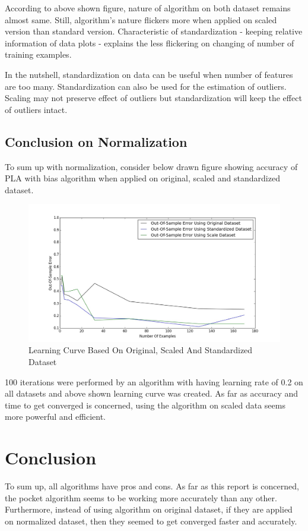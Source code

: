 \documentclass{article}
\begin{document}
\par According to above shown figure, nature of algorithm on both dataset remains almost same. Still, algorithm's nature flickers more when applied on scaled version than standard version. Characteristic of standardization - keeping relative information of data plots - explains the less flickering on changing of number of training examples. 

\par In the nutshell, standardization on data can be useful when number of features are too many. Standardization can also be used for the estimation of outliers. Scaling may not preserve effect of outliers but standardization will keep the effect of outliers intact. 
\subsection{Conclusion on Normalization}
To sum up with normalization, consider below drawn figure showing accuracy of PLA with bias algorithm when applied on original, scaled and standardized dataset.\
\begin{figure}[H]
\centering
\includegraphics[width=6in]{images/Original_Norm_Stand.jpeg}
\caption{Learning Curve Based On Original, Scaled And Standardized Dataset}
\label{6. Learning Curve}
  
\end{figure}

\par 100 iterations were performed by an algorithm with having learning rate of 0.2 on all datasets and above shown learning curve was created. As far as accuracy and time to get converged is concerned, using the algorithm on scaled data seems more powerful and efficient.
\section{Conclusion}
\par To sum up, all algorithms have pros and cons. As far as this report is concerned, the pocket algorithm seems to be working more accurately than any other. Furthermore, instead of using algorithm on original dataset, if they are applied on normalized dataset, then they seemed to get converged faster and accurately. 


\end{document}
